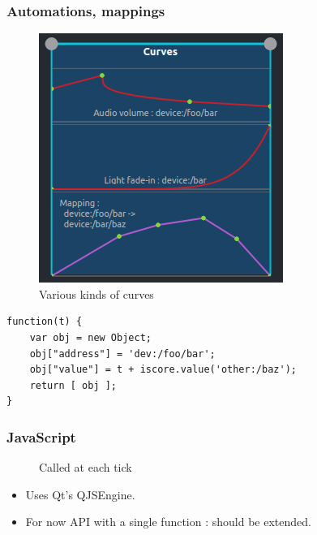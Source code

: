 \documentclass{beamer}
\begin{document}
    
    \begin{frame}
        \frametitle{Automations, mappings}
        \begin{figure}
        	\centering
        	\includegraphics[scale=0.7]{images/curves.png}
        	\caption{Various kinds of curves}
        \end{figure}    
        
    \end{frame}
    
    \begin{lrbox}{\codebox}
    	\begin{lstlisting}
function(t) { 
    var obj = new Object; 
    obj["address"] = 'dev:/foo/bar'; 
    obj["value"] = t + iscore.value('other:/baz'); 
    return [ obj ]; 
}
    	\end{lstlisting}
    \end{lrbox}
    
    \begin{frame}
    	\frametitle{JavaScript}
    	\begin{figure}
    		\centering
    	    \usebox{\codebox}
    	    \caption{Called at each tick}
    	\end{figure}
    	
    	\begin{itemize}
    		\item Uses Qt's QJSEngine.
    		\item For now API with a single function : should be extended.
    	\end{itemize}
    \end{frame}
    
\end{document}
